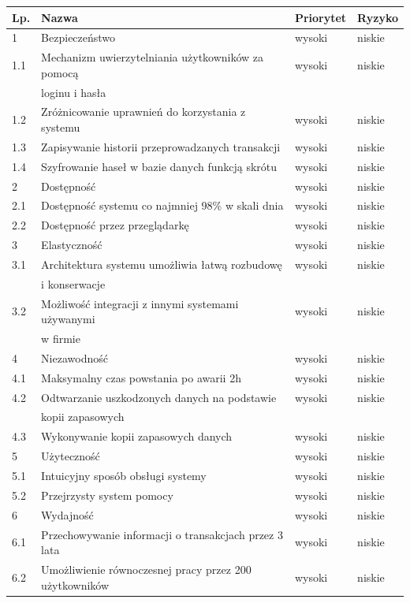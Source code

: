 \begin{table}[h]
	\begin{center}
		\begin{tabular}{| l | l | l | l |}
			\hline
			\textbf{Lp.} & \textbf{Nazwa} & \textbf{Priorytet} & \textbf{Ryzyko} \\
			\hline
			1 & Bezpieczeństwo & wysoki & niskie \\
			1.1 & Mechanizm uwierzytelniania użytkowników za pomocą & wysoki & niskie \\
			& loginu i hasła & & \\
			1.2 & Zróżnicowanie uprawnień do korzystania z systemu & wysoki & niskie \\
			1.3 & Zapisywanie historii przeprowadzanych transakcji & wysoki & niskie \\
			1.4 & Szyfrowanie haseł w bazie danych funkcją skrótu & wysoki & niskie \\
			\hline
			2 & Dostępność & wysoki & niskie \\
			2.1 & Dostępność systemu co najmniej 98\% w skali dnia & wysoki & niskie \\ 
			2.2 & Dostępność przez przeglądarkę & wysoki & niskie \\
			\hline
			3 & Elastyczność & wysoki & niskie \\
			3.1 & Architektura systemu umożliwia łatwą rozbudowę  & wysoki & niskie \\
			& i konserwacje & & \\
			3.2 & Możliwość integracji z innymi systemami używanymi & wysoki & niskie \\
			& w firmie & & \\
			
			\hline
			4 & Niezawodność & wysoki & niskie \\
			4.1 & Maksymalny czas powstania po awarii 2h & wysoki & niskie \\
			4.2 & Odtwarzanie uszkodzonych danych na podstawie & wysoki	& niskie \\
			& kopii zapasowych & & \\
			4.3 & Wykonywanie kopii zapasowych danych & wysoki & niskie \\
			\hline
			5 & Użyteczność & wysoki & niskie \\
			5.1 & Intuicyjny sposób obsługi systemy & wysoki & niskie \\
			5.2 & Przejrzysty system pomocy & wysoki & niskie \\
			\hline
			6 & Wydajność & wysoki & niskie \\
			6.1 & Przechowywanie informacji o transakcjach przez 3 lata & wysoki & niskie
			\\
			6.2 & Umożliwienie równoczesnej pracy przez 200 użytkowników & wysoki &
			niskie
			\\
			\hline
		\end{tabular}
	\end{center}
\end{table}
\FloatBarrier

